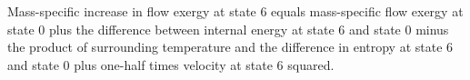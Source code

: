 Mass-specific increase in flow exergy at state 6 equals mass-specific flow exergy at state 0 plus the difference between internal energy at state 6 and state 0 minus the product of surrounding temperature and the difference in entropy at state 6 and state 0 plus one-half times velocity at state 6 squared.
